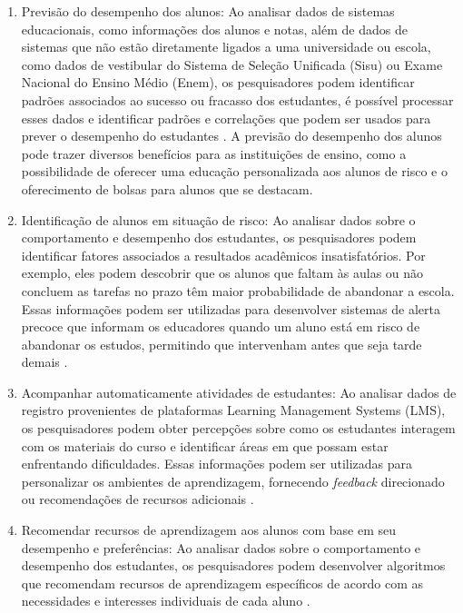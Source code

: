 \begin{enumerate}
    \item Previsão do desempenho dos alunos: Ao analisar dados de sistemas educacionais, como informações dos alunos e notas, além de dados de sistemas que não estão diretamente ligados a uma universidade ou escola, como dados de vestibular do Sistema de Seleção Unificada (Sisu) ou Exame Nacional do Ensino Médio (Enem), os pesquisadores podem identificar padrões associados ao sucesso ou fracasso dos estudantes, é possível processar esses dados e identificar padrões e correlações que podem ser usados para prever o desempenho do estudantes \cite{avaandparpinelli:2020}. A previsão do desempenho dos alunos pode trazer diversos benefícios para as instituições de ensino, como a possibilidade de oferecer uma educação personalizada aos alunos de risco e o oferecimento de bolsas para alunos que se destacam.

    \item Identificação de alunos em situação de risco: Ao analisar dados sobre o comportamento e desempenho dos estudantes, os pesquisadores podem identificar fatores associados a resultados acadêmicos insatisfatórios. Por exemplo, eles podem descobrir que os alunos que faltam às aulas ou não concluem as tarefas no prazo têm maior probabilidade de abandonar a escola. Essas informações podem ser utilizadas para desenvolver sistemas de alerta precoce que informam os educadores quando um aluno está em risco de abandonar os estudos, permitindo que intervenham antes que seja tarde demais \cite{ramos:2020}.

    \item Acompanhar automaticamente atividades de estudantes: Ao analisar dados de registro provenientes de plataformas Learning Management Systems (LMS), os pesquisadores podem obter percepções sobre como os estudantes interagem com os materiais do curso e identificar áreas em que possam estar enfrentando dificuldades. Essas informações podem ser utilizadas para personalizar os ambientes de aprendizagem, fornecendo \textit{feedback} direcionado ou recomendações de recursos adicionais \cite{Santos2019}.

    \item Recomendar recursos de aprendizagem aos alunos com base em seu desempenho e preferências: Ao analisar dados sobre o comportamento e desempenho dos estudantes, os pesquisadores podem desenvolver algoritmos que recomendam recursos de aprendizagem específicos de acordo com as necessidades e interesses individuais de cada aluno \cite{9637207}.
\end{enumerate}

